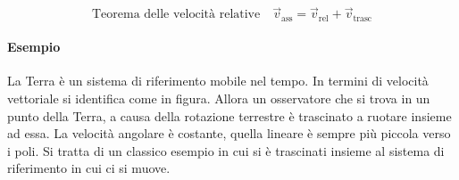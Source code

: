 \[
	\text{Teorema delle velocità relative} \quad \boxed{\vec{v}_{\text{ass}}=\vec{v}_{\text{rel}}+\vec{v}_{\text{trasc}}}
\]

\paragraph{Esempio} La Terra è un sistema di riferimento mobile nel tempo. In termini di velocità vettoriale si identifica come in figura. Allora un osservatore che si trova in un punto della Terra, a causa della rotazione terrestre è trascinato a ruotare insieme ad essa. La velocità angolare è costante, quella lineare è sempre più piccola verso i poli. Si tratta di un classico esempio in cui si è trascinati insieme al sistema di riferimento in cui ci si muove.

\begin{figure}[htpb]
	\centering


	\begin{tikzpicture}[x=0.75pt,y=0.75pt,yscale=-1,xscale=1]


\end{tikzpicture}
\end{figure}
